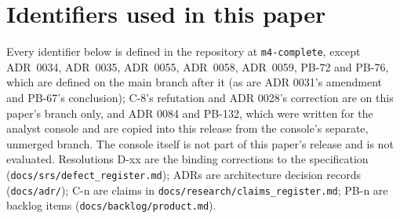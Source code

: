 \appendix
\section{Identifiers used in this paper}
\label{app:identifiers}

Every identifier below is defined in the repository at \texttt{m4-complete}, except ADR~0034, ADR~0035,
ADR~0055, ADR~0058, ADR~0059, PB-72 and PB-76, which are defined on the main branch after it (as are ADR 0031's amendment and
PB-67's conclusion); C-8's refutation and ADR 0028's correction are on this paper's branch only, and ADR 0084 and PB-132, which were written for the analyst console and are
copied into this release from the console's separate, unmerged branch. The console itself is not part
of this paper's release and is not evaluated. Resolutions D-xx are the
binding corrections to the specification (\texttt{docs/srs/defect\_register.md}); ADRs are architecture
decision records (\texttt{docs/adr/}); C-n are claims in \texttt{docs/research/claims\_register.md}; PB-n
are backlog items (\texttt{docs/backlog/product.md}).

